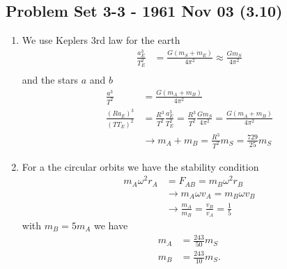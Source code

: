 \documentclass[../main.tex]{subfiles}
\begin{document}
\subsection{Problem Set 3-3 - 1961 Nov 03 (3.10)}
\begin{enumerate}[label=(\alph*)]
\item We use Keplers 3rd law for the earth
\begin{align}
    \frac{a_E^3}{T_E^2}&=\frac{G(m_S+m_E)}{4\pi^2}\approx\frac{Gm_S}{4\pi^2}\\
\end{align}
and the stars $a$ and $b$
\begin{align}
    \frac{a^3}{T^2}&=\frac{G(m_A+m_B)}{4\pi^2}\\
    \frac{(Ra_E)^3}{(TT_E)^2}&=\frac{R^3}{T^2}\frac{a_E^3}{T_E^2}=\frac{R^3}{T^2}\frac{Gm_S}{4\pi^2}=\frac{G(m_A+m_B)}{4\pi^2}\\
    &\rightarrow m_A+m_B = \frac{R^3}{T^2}m_S=\frac{729}{25}m_S
\end{align}

\item For a the circular orbits we have the stability condition
\begin{align}
    m_A\omega^2r_A&=F_{AB}=m_B\omega^2r_B\\
    &\rightarrow m_A\omega v_A=m_B\omega v_B\\
    &\rightarrow \frac{m_A}{m_B} =\frac{v_B}{v_A}=\frac{1}{5}
\end{align}
with $m_B=5m_A$ we have 
\begin{align}
    m_A&=\frac{243}{50}m_S\\
    m_B&=\frac{243}{10}m_S.
\end{align}
\end{enumerate}
\end{document}
